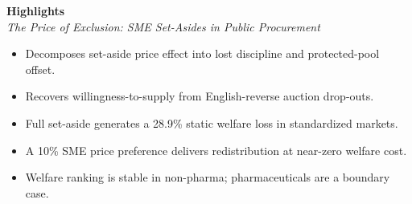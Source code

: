 \documentclass[12pt]{article}
\begin{document}
\begin{center}
\large\textbf{Highlights}\\[0.4em]
\normalsize\emph{The Price of Exclusion: SME Set-Asides in Public Procurement}
\end{center}

\bigskip

\begin{itemize}
\setlength{\itemsep}{0.4em}
\item Decomposes set-aside price effect into lost discipline and protected-pool offset.
\item Recovers willingness-to-supply from English-reverse auction drop-outs.
\item Full set-aside generates a 28.9\% static welfare loss in standardized markets.
\item A 10\% SME price preference delivers redistribution at near-zero welfare cost.
\item Welfare ranking is stable in non-pharma; pharmaceuticals are a boundary case.
\end{itemize}
\end{document}
